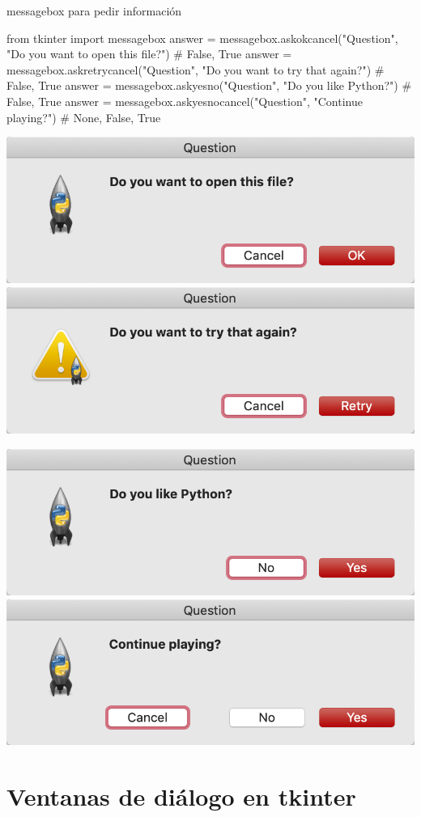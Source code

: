 \documentclass[10pt, envcountsect , spanish]{beamer}
\begin{document}
\begin{frame}[fragile]{messagebox para pedir información} 

\footnotesize
\begin{pyverbatim}[][frame=single]
from tkinter import messagebox
answer = messagebox.askokcancel("Question", "Do you want to open this file?")
# False, True
answer = messagebox.askretrycancel("Question", "Do you want to try that again?")
# False, True
answer = messagebox.askyesno("Question", "Do you like Python?")
# False, True
answer = messagebox.askyesnocancel("Question", "Continue playing?")
# None, False, True
\end{pyverbatim}

\centerline{\includegraphics[width=.45\textwidth]{fig/askokcancel} \hfill
\includegraphics[width=.45\textwidth]{fig/askretrycancel}
}

\centerline{\includegraphics[width=.45\textwidth]{fig/askyesno} \hfill
\includegraphics[width=.45\textwidth]{fig/askyesnocancel}
}

\end{frame}



\section{Ventanas de diálogo en tkinter}
\end{document}
